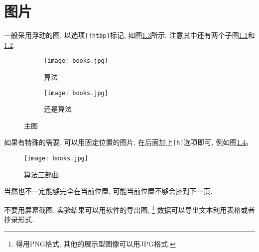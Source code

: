 \chapter{图片}

  一般采用浮动的图, 以选项\texttt{[!htbp]}标记, 如图\ref{fig:algorithm}所示,
注意其中还有两个子图\ref{fig:algorithm:a}和\ref{fig:algorithm:b}.

\begin{figure}[!htbp]
\centering
\begin{subfigure}[t]{.3\textwidth}
  \centering
  \texttt{[image: books.jpg]}
  \caption{算法}
  \label{fig:algorithm:a}
\end{subfigure}
\quad
\begin{subfigure}[t]{.3\textwidth}
  \centering
  \texttt{[image: books.jpg]}
  \caption{还是算法}
  \label{fig:algorithm:b}
\end{subfigure}
\caption{主图}
\label{fig:algorithm}
\end{figure}


  如果有特殊的需要, 可以用固定位置的图片, 在后面加上\texttt{[h]}选项即可, 例如图\ref{fig:books}。

\begin{figure}[h]
    \centering
    \texttt{[image: books.jpg]}
    \caption{算法三部曲.}
    \label{fig:books}
\end{figure}

  当然也不一定能够完全在当前位置, 可能当前位置不够会挤到下一页.

  不要用屏幕截图, 实验结果可以用软件的导出图,%
\footnote{得用PNG格式, 其他的展示型图像可以用JPG格式.}
数据可以导出文本利用表格或者抄录形式.
